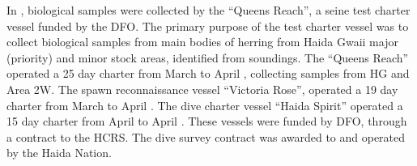 In \thisYr{}, biological samples were collected by the ``Queens Reach'', a seine test charter vessel funded by the DFO.
The primary purpose of the test charter vessel was to collect biological samples from main bodies of herring from Haida Gwaii major (priority) and minor stock areas, identified from soundings.
The ``Queens Reach'' operated a 25 day charter from March  to April , collecting samples from HG and Area 2W.
The spawn reconnaissance vessel ``Victoria Rose'', operated a 19 day charter from March  to April .
The dive charter vessel ``Haida Spirit'' operated a 15 day charter from April  to April .
These vessels were funded by DFO, through a contract to the HCRS.
The dive survey contract was awarded to and operated by the Haida Nation.